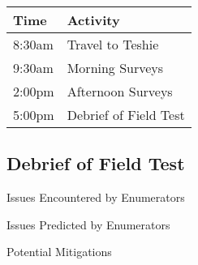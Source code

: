\documentclass[a4paper,agenda,11pt]{meetingmins}
\begin{document}
\begin{tabularx}{\textwidth}{| l | X |} \hline
Time & Activity \\ \hline \hline

8:30am &
Travel to Teshie 
 \\ \hline

9:30am &
Morning Surveys 
\\ \hline

2:00pm &
Afternoon Surveys 
 \\ \hline

5:00pm &
Debrief of Field Test 
 \\ \hline

\end{tabularx}

\subsection{Debrief of Field Test}
\begin{subitems}
\item Issues Encountered by Enumerators
\item Issues Predicted by Enumerators
\item Potential Mitigations
\end{subitems}
\end{document}
